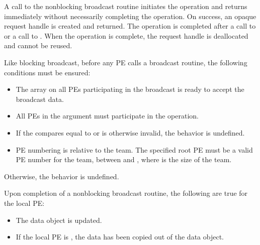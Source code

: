 \begin{apidefinition}
{    A call to the nonblocking broadcast routine initiates the operation and returns
    immediately without necessarily completing the operation. On success,
    an opaque request handle is created and returned. The
    operation is completed after a call to  or a
    call to . When the operation is complete, the request handle
    is deallocated and cannot be reused.

    Like blocking broadcast, before any \ac{PE} calls a broadcast routine, the following
    conditions must be ensured:
    \begin{itemize}
    \item The \dest{} array on all \acp{PE} participating in the broadcast
      is ready to accept the broadcast data.
    \item All \acp{PE} in the  argument must participate in
      the operation.
    \item If the  compares equal to  or is
      otherwise invalid, the behavior is undefined.
    \item \ac{PE} numbering is relative to the team. The specified
      root \ac{PE} must be a valid \ac{PE} number for the team,
      between  and , where  is the size of
      the team.
    \end{itemize}
    Otherwise, the behavior is undefined.

    Upon completion of a nonblocking broadcast routine, the following are true for the local
    \ac{PE}:
    \begin{itemize}
    \item The \dest{} data object is updated.
    \item If the local \ac{PE} is , the data has been copied
          out of the \source{} data object.
    \end{itemize}
}




\end{apidefinition}
